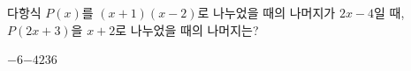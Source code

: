 다항식 $P(x)$를 $(x+1)(x-2)$로 나누었을 때의 나머지가 $2x-4$일 때, $P(2x+3)$을 $x+2$로 나누었을 때의 나머지는?
\begin{choices32}{$-6$}{$-4$}{$2$}{$3$}{$6$}\end{choices32}
